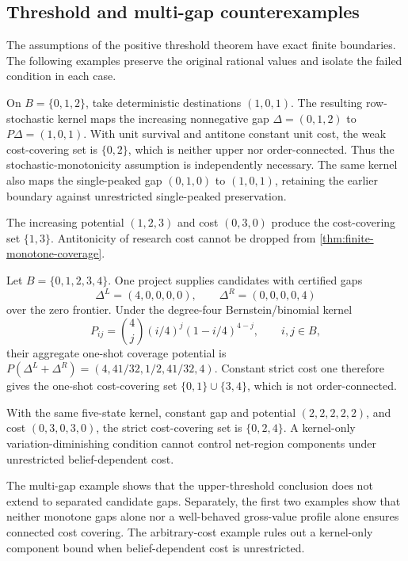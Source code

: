 \subsection{Threshold and multi-gap counterexamples}

The assumptions of the positive threshold theorem have exact finite
boundaries.  The following examples preserve the original rational values
and isolate the failed condition in each case.

\begin{counterexample}
\label{cx:single-peaked-disconnected}
On \(B=\{0,1,2\}\), take deterministic destinations \((1,0,1)\).
The resulting row-stochastic kernel maps the increasing nonnegative gap
\(\Delta=(0,1,2)\) to \(P\Delta=(1,0,1)\).  With unit survival and
antitone constant unit cost, the weak cost-covering set is \(\{0,2\}\), which
is neither upper nor order-connected.  Thus the stochastic-monotonicity
assumption is independently necessary.  The same kernel also maps the
single-peaked gap \((0,1,0)\) to \((1,0,1)\), retaining the earlier boundary
against unrestricted single-peaked preservation.
\end{counterexample}

\begin{counterexample}
\label{cx:arbitrary-cost-disconnected}
The increasing potential \((1,2,3)\) and cost \((0,3,0)\) produce the
cost-covering set \(\{1,3\}\).  Antitonicity of research cost cannot be dropped
from \cref{thm:finite-monotone-coverage}.
\end{counterexample}

\begin{counterexample}
\label{cx:multi-gap-disconnection}
Let \(B=\{0,1,2,3,4\}\).  One project supplies candidates with certified gaps
\[
  \Delta^L=(4,0,0,0,0),\qquad
  \Delta^R=(0,0,0,0,4)
\]
over the zero frontier.  Under the degree-four Bernstein/binomial kernel
\[
  P_{ij}=\binom{4}{j}(i/4)^j(1-i/4)^{4-j},
  \qquad i,j\in B,
\]
their aggregate one-shot coverage potential is
\(P(\Delta^L+\Delta^R)=(4,41/32,1/2,41/32,4)\).  Constant strict cost one
therefore gives the one-shot cost-covering set
\(\{0,1\}\cup\{3,4\}\), which is not order-connected.
\end{counterexample}

\begin{counterexample}
\label{cx:arbitrary-cost-components}
With the same five-state kernel, constant gap and potential
\((2,2,2,2,2)\), and cost \((0,3,0,3,0)\), the strict cost-covering set is
\(\{0,2,4\}\).  A kernel-only variation-diminishing condition cannot control
net-region components under unrestricted belief-dependent cost.
\end{counterexample}

The multi-gap example shows that the upper-threshold conclusion does not
extend to separated candidate gaps.  Separately, the first two examples show
that neither monotone gaps alone nor a well-behaved gross-value profile alone
ensures connected cost covering.  The arbitrary-cost example rules out a
kernel-only component bound when belief-dependent cost is unrestricted.
